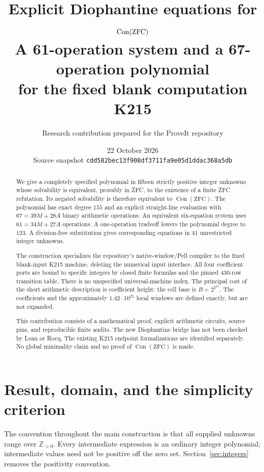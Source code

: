 \documentclass[11pt,a4paper]{article}
\title{\textbf{Explicit Diophantine equations for
 \(\Con(\mathrm{ZFC})\)}\\[5pt]
 \large A 61-operation system and a 67-operation polynomial\\
 for the fixed blank computation K215}
\author{Research contribution prepared for the ProveIt repository}
\date{22 October 2026\\[3pt]
 \small Source snapshot \texttt{cdd582bec13f908df3711fa9e05d1ddac368a5db}}
\theoremstyle{definition}
\theoremstyle{remark}
\newcommand{\Pos}{\mathbb Z_{>0}}
\newcommand{\Con}{\operatorname{Con}}
\begin{document}
\maketitle
\begin{abstract}
We give a completely specified polynomial in fifteen strictly positive
integer unknowns whose solvability is equivalent, provably in ZFC, to the
existence of a finite ZFC refutation. Its negated solvability is therefore
equivalent to \(\Con(\mathrm{ZFC})\). The polynomial has exact degree \(155\)
and an explicit straight-line evaluation with \(67=39M+28A\) binary
arithmetic operations. An equivalent six-equation system uses
\(61=34M+27A\) operations. A one-operation tradeoff lowers the polynomial
degree to \(123\). A division-free substitution gives corresponding
equations in \(41\) unrestricted integer unknowns.

The construction specializes the repository's native-window/Pell compiler
to the fixed blank-input K215 machine, deleting the numerical input
interface. All four coefficient ports are bound to specific integers by
closed finite formulas and the pinned 430-row transition table. There is
no unspecified universal-machine index. The principal cost of the short
arithmetic description is coefficient height: the cell base is
\(B=2^{5^{67}}\). The coefficients and the approximately
\(1.42\cdot10^{21}\) local windows are defined exactly, but are not expanded.

This contribution consists of a mathematical proof, explicit arithmetic
circuits, source pins, and reproducible finite audits. The new Diophantine
bridge has not been checked by Lean or Rocq. The existing K215 endpoint
formalizations are identified separately. No global minimality claim and
no proof of \(\Con(\mathrm{ZFC})\) is made.
\end{abstract}
\clearpage
\tableofcontents
\newpage

\section{Result, domain, and the simplicity criterion}
The convention throughout the main construction is that all supplied
unknowns range over \(\Pos\). Every intermediate expression is an ordinary
integer polynomial; intermediate values need not be positive off the
zero set. Section~\ref{sec:integers} removes the positivity convention.
\end{document}
